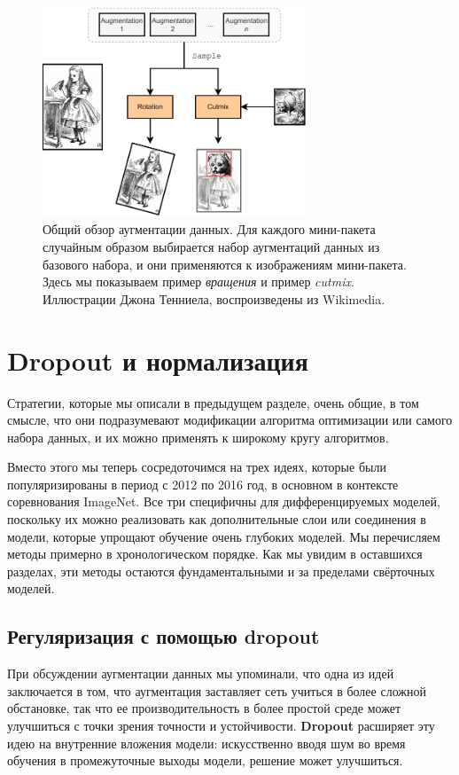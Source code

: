 \begin{figure}[t]
    \centering
    \includegraphics[width=0.7\textwidth]{images/data_augmentation}
    \caption{Общий обзор аугментации данных. Для каждого мини-пакета случайным образом выбирается набор аугментаций данных из базового набора, и они применяются к изображениям мини-пакета. Здесь мы показываем пример \textit{вращения} и пример \textit{cutmix}. Иллюстрации Джона Тенниела, воспроизведены из Wikimedia.}
    \label{fig:cutmix}
\end{figure}

\section{Dropout и нормализация}

Стратегии, которые мы описали в предыдущем разделе, очень общие, в том смысле, что они подразумевают модификации алгоритма оптимизации или самого набора данных, и их можно применять к широкому кругу алгоритмов. 

Вместо этого мы теперь сосредоточимся на трех идеях, которые были популяризированы в период с 2012 по 2016 год, в основном в контексте соревнования ImageNet. Все три специфичны для дифференцируемых моделей, поскольку их можно реализовать как дополнительные слои или соединения в модели, которые упрощают обучение очень глубоких моделей. Мы перечисляем методы примерно в хронологическом порядке. Как мы увидим в оставшихся разделах, эти методы остаются фундаментальными и за пределами свёрточных моделей.

\subsection{Регуляризация с помощью dropout}
\label{subsec:dropout}

При обсуждении аугментации данных мы упоминали, что одна из идей заключается в том, что аугментация заставляет сеть учиться в более сложной обстановке, так что ее производительность в более простой среде может улучшиться с точки зрения точности и устойчивости. \textbf{Dropout} \cite{srivastava2014dropout} расширяет эту идею на внутренние вложения модели: искусственно вводя шум во время обучения в промежуточные выходы модели, решение может улучшиться.

